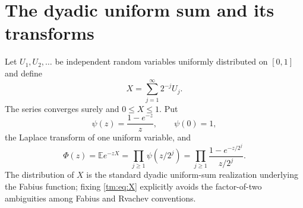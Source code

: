\documentclass[11pt,a4paper,oneside,openany]{book}
\numberwithin{equation}{chapter}
\theoremstyle{definition}
\theoremstyle{remark}
\newcommand{\E}{\mathbb E}
\begin{document}
\section{The dyadic uniform sum and its transforms}
Let $U_1,U_2,\ldots$ be independent random variables uniformly distributed
on $[0,1]$ and define
\begin{equation}\label{tm:eq:X}
 X=\sum_{j=1}^{\infty}2^{-j}U_j.
\end{equation}
The series converges surely and $0\le X\le1$. Put
\begin{equation}\label{tm:eq:psi}
 \psi(z)=\frac{1-e^{-z}}{z},\qquad\psi(0)=1,
\end{equation}
the Laplace transform of one uniform variable, and
\begin{equation}\label{tm:eq:Phi}
 \Phi(z)=\E e^{-zX}=\prod_{j\ge1}\psi(z/2^j)
       =\prod_{j\ge1}\frac{1-e^{-z/2^j}}{z/2^j}.
\end{equation}
The distribution of $X$ is the standard dyadic uniform-sum realization
underlying the Fabius function; fixing \eqref{tm:eq:X} explicitly avoids
the factor-of-two ambiguities among Fabius and Rvachev conventions.
\end{document}
